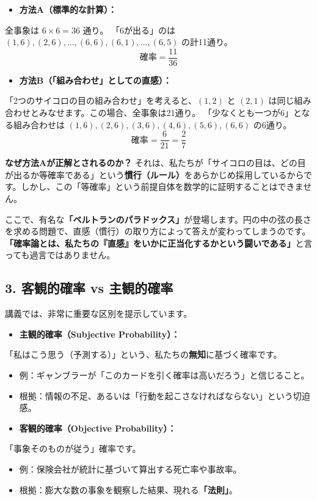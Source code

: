 \documentclass[a4paper,11pt,openany]{ltjsbook}
\begin{document}
\begin{lecturebox}
\begin{itemize}[leftmargin=2em]
\item \textbf{方法A（標準的な計算）：}
\end{itemize}
    全事象は $6 \times 6 = 36$ 通り。
    「6が出る」のは $(1,6), (2,6), \dots, (6,6), (6,1), \dots, (6,5)$ の計11通り。
    $$\text{確率} = \frac{11}{36}$$

\begin{itemize}[leftmargin=2em]
\item \textbf{方法B（「組み合わせ」としての直感）：}
\end{itemize}
    「2つのサイコロの目の組み合わせ」を考えると、$(1,2)$ と $(2,1)$ は同じ組み合わせとみなせます。この場合、全事象は21通り。
    「少なくとも一つが6」となる組み合わせは $(1,6), (2,6), (3,6), (4,6), (5,6), (6,6)$ の6通り。
    $$\text{確率} = \frac{6}{21} = \frac{2}{7}$$

\textbf{なぜ方法Aが正解とされるのか？}
それは、私たちが「サイコロの目は、どの目が出るか等確率である」という\textbf{慣行（ルール）}をあらかじめ採用しているからです。しかし、この「等確率」という前提自体を数学的に証明することはできません。

ここで、有名な\textbf{「ベルトランのパラドックス」}が登場します。円の中の弦の長さを求める問題で、直感（慣行）の取り方によって答えが変わってしまうのです。
\textbf{「確率論とは、私たちの『直感』をいかに正当化するかという闘いである」}と言っても過言ではありません。

\subsection*{3. 客観的確率 vs 主観的確率}

講義では、非常に重要な区別を提示しています。

\begin{itemize}[leftmargin=2em]
\item \textbf{主観的確率（Subjective Probability）：}
\end{itemize}
    「私はこう思う（予測する）」という、私たちの\textbf{無知}に基づく確率です。
\begin{itemize}[leftmargin=2em]
\item 例：ギャンブラーが「このカードを引く確率は高いだろう」と信じること。
\item 根拠：情報の不足、あるいは「行動を起こさなければならない」という切迫感。
\end{itemize}

\begin{itemize}[leftmargin=2em]
\item \textbf{客観的確率（Objective Probability）：}
\end{itemize}
    「事象そのものが従う」確率です。
\begin{itemize}[leftmargin=2em]
\item 例：保険会社が統計に基づいて算出する死亡率や事故率。
\item 根拠：膨大な数の事象を観察した結果、現れる\textbf{「法則」}。
\end{itemize}


\end{lecturebox}
\end{document}
